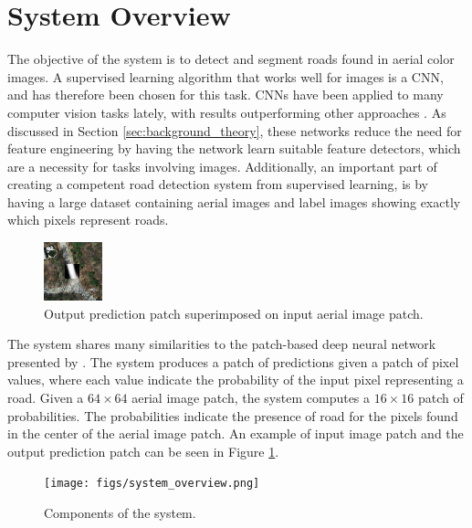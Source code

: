 \section{System Overview}
\label{sec:systemOverview}



The objective of the system is to detect and segment roads found in aerial color images. A supervised learning algorithm that works well for images is a \ac{CNN}, and has therefore been chosen for this task. \ac{CNN}s have been applied to many computer vision tasks lately, with results outperforming other approaches \citep{Krizhevsky_imagenet}. As discussed in Section \ref{sec:background_theory}, these networks reduce the need for feature engineering by having the network learn suitable feature detectors, which are a necessity for tasks involving images. Additionally, an important part of creating a competent road detection system from supervised learning, is by having a large dataset containing aerial images and label images showing exactly which pixels represent roads.\\

\begin{figure}[t]
\begin{center}
\includegraphics[width=0.15\columnwidth]{figs/labeloverlay.png}
\caption[Input patch and prediction]{Output prediction patch superimposed on input aerial image patch.}
\label{fig:system_data_patch}
\end{center}
\end{figure}

The system shares many similarities to the patch-based deep neural network presented by \cite{Mnih_aerial_images_noisy}. The system produces a patch of predictions given a patch of pixel values, where each value indicate the probability of the input pixel representing a road. Given a $64 \times 64$ aerial image patch, the system computes a $16 \times 16$ patch of probabilities. The probabilities indicate the presence of road for the pixels found in the center of the aerial image patch. An example of input image patch and the output prediction patch can be seen in Figure \ref{fig:system_data_patch}.  \\

\begin{figure}[t]
\begin{center}
\texttt{[image: figs/system\_overview.png]}
\caption[Components of the system]{Components of the system.}
\label{fig:system_components}
\end{center}
\end{figure}

